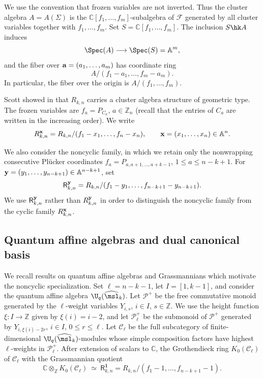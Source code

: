 \documentclass[11pt]{amsart}
\numberwithin{equation}{section}
\newcommand{\bC}{{\mathbb C}}
\newcommand{\bZ}{{\mathbb Z}}
\newcommand{\bA}{{\mathbb A}}
\newcommand{\bfx}{{\bf x}}
\newcommand{\bfy}{{\bf y}}
\begin{document}
We use the convention that frozen variables are not inverted.
Thus the cluster algebra $A=A(\Sigma)$ is the
$\bC[f_1,\ldots,f_m]$-subalgebra of $\mathcal F$ generated by
all cluster variables together with $f_1,\ldots,f_m$.
Set $S=\bC[f_1,\ldots,f_m]$.  The inclusion $S\hk A$ induces
\[
\Spec(A)\longrightarrow\Spec(S)=\bA^m,
\]
and the fiber over
${\bf a}=(a_1,\ldots,a_m)$ has coordinate ring
$$A/(f_1-a_1,\ldots,f_m-a_m).$$  In particular, the fiber over the
origin is $A/(f_1,\ldots,f_m)$.

Scott showed in \cite{Sc06} that $R_{k,n}$ carries a cluster algebra
structure of geometric type.   The frozen variables are
$f_a=P_{C_a}$, $a\in\bZ_n$ (recall that the entries of $C_a$ are written in the increasing order).  We write
\begin{equation}\label{eq:prelim-cyclic-family}
R_{k,n}^{\bfx}
=
R_{k,n}/(f_1-x_1,\ldots,f_n-x_n),
\qquad
\bfx=(x_1,\ldots,x_n)\in\bA^n.
\end{equation}

We also consider the noncyclic family, in which we retain only the nonwrapping consecutive
Pl\"ucker coordinates
$f_a=P_{a,a+1,\ldots,a+k-1}$,
$1\leq a\leq n-k+1$.  For
$\bfy=(y_1,\ldots,y_{n-k+1})\in\bA^{n-k+1}$, set
\begin{equation}\label{eq:prelim-noncyclic-family}
{\mathsf R}_{k,n}^{\bfy}
=
R_{k,n}/(f_1-y_1,\ldots,f_{n-k+1}-y_{n-k+1}).
\end{equation}
We use ${\mathsf R}_{k,n}^{\bfy}$ rather than
$R_{k,n}^{\bfy}$ in order to distinguish the noncyclic family from
the cyclic family $R_{k,n}^{\bfx}$.

\subsection{Quantum affine algebras and dual canonical basis}
\label{subsec:quantum-affine-algebras}

We recall results on quantum affine algebras and Grassmannians \cite{HL10, CDFL20} which motivate the noncyclic
specialization.  Set $\ell=n-k-1$, let
$I=[1,k-1]$, and consider the quantum affine algebra
$\U_q(\widehat{\msl}_k)$.  Let $\mathcal P^+$ be the free
commutative monoid generated by the $\ell$-weight variables
$Y_{i,s}$, $i\in I$, $s\in\bZ$.  We use the height function
$\xi:I\to\bZ$ given by $\xi(i)=i-2$, and let
$\mathcal P_\ell^+$ be the submonoid of $\mathcal P^+$ generated
by $Y_{i,\xi(i)-2r}$, $i\in I$, $0\leq r\leq\ell$. Let $\mathcal C_\ell$ be the full subcategory of
finite-dimensional $\U_q(\widehat{\msl}_k)$-modules
whose simple composition factors have highest
$\ell$-weights in $\mathcal P_\ell^+$. After extension of
scalars to $\bC$, the Grothendieck ring $K_0(\mathcal{C}_{\ell})$ of $\mathcal C_\ell$ with
the Grassmannian quotient
\[
\bC\otimes_{\bZ}K_0(\mathcal C_\ell)
\ \simeq\
{\mathsf R}_{k,n}^{\mathbf 1}
=
R_{k,n}/(f_1-1,\ldots,f_{n-k+1}-1).
\] 
\end{document}

